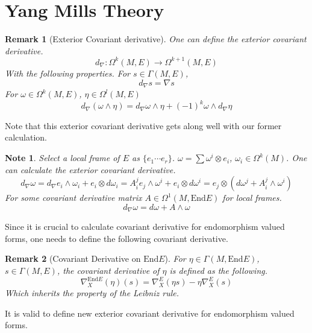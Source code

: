 \documentclass{article}
\newtheorem{rem}{Remark}
\newtheorem{note}{Note}
\begin{document}
\section*{Yang Mills Theory}

\begin{rem}[Exterior Covariant derivative]
    One can define the exterior covariant derivative. 
    \[
        d_\nabla: \Omega^k(M,E)\rightarrow \Omega^{k+1}(M,E)
    \]
    With the following properties. For $s\in \Gamma(M,E)$,
    \[
        d_\nabla s = \nabla s 
    \]
    For $\omega\in \Omega^k(M,E)$, $\eta \in \Omega^l(M,E)$
    \[
        d_\nabla(\omega \wedge \eta ) = d_\nabla \omega \wedge \eta + (-1)^k \omega \wedge d_\nabla \eta
    \]
\end{rem}

Note that this exterior covariant derivative gets along well with our former calculation. 

\begin{note}
    Select a local frame of $E$ as $\{e_1\cdots e_r\}$. 
    $\omega = \sum \omega^i\otimes e_i$, $\omega_i \in \Omega^k(M)$. One can calculate the exterior covariant derivative.
    \[
        d_\nabla \omega = d_\nabla e_i \wedge \omega_i + e_i \otimes d\omega_i = A^j_i e_j \wedge \omega^i + e_i \otimes d\omega^i = e_j \otimes (d\omega^j + A^j_i \wedge \omega^i)
    \]
    For some covariant derivative matrix $A\in\Omega^1(M,\mathrm{End} E)$ for local frames. 
    \[
        d_\nabla \omega = d\omega + A\wedge \omega
    \]
\end{note}

Since it is crucial to calculate covariant derivative for endomorphism valued forms, one needs to define the following covariant derivative. 

\begin{rem}[Covariant Derivative on $\mathrm{End}E$]
    For $\eta\in \Gamma(M,\mathrm{End}E)$, $s\in \Gamma(M,E)$, the covariant derivative of $\eta$ is defined as the following. 
    \[
        \nabla^{\mathrm{End}E}_X(\eta) (s) = \nabla_X^E(\eta s) - \eta \nabla_X^E(s)
    \]
    Which inherits the property of the Leibniz rule. 
\end{rem}

It is valid to define new exterior covariant derivative for endomorphism valued forms. 
\end{document}
